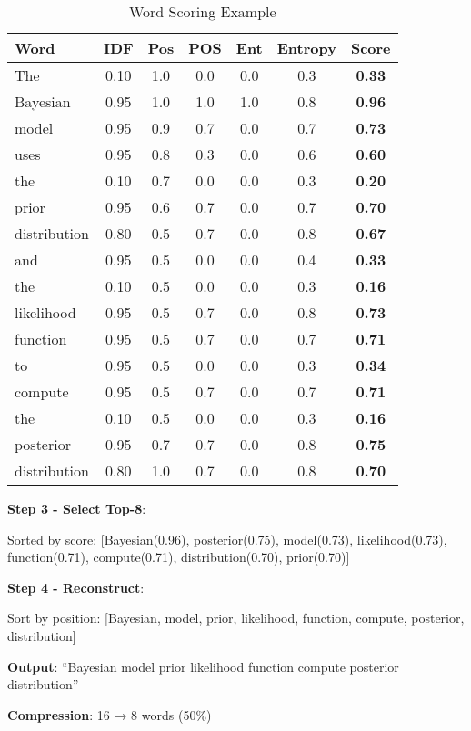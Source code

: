 \begin{table}[h]
\centering
\caption{Word Scoring Example}
\begin{tabular}{lcccccc}
\toprule
Word & IDF & Pos & POS & Ent & Entropy & \textbf{Score} \\
\midrule
The & 0.10 & 1.0 & 0.0 & 0.0 & 0.3 & \textbf{0.33} \\
Bayesian & 0.95 & 1.0 & 1.0 & 1.0 & 0.8 & \textbf{0.96} \\
model & 0.95 & 0.9 & 0.7 & 0.0 & 0.7 & \textbf{0.73} \\
uses & 0.95 & 0.8 & 0.3 & 0.0 & 0.6 & \textbf{0.60} \\
the & 0.10 & 0.7 & 0.0 & 0.0 & 0.3 & \textbf{0.20} \\
prior & 0.95 & 0.6 & 0.7 & 0.0 & 0.7 & \textbf{0.70} \\
distribution & 0.80 & 0.5 & 0.7 & 0.0 & 0.8 & \textbf{0.67} \\
and & 0.95 & 0.5 & 0.0 & 0.0 & 0.4 & \textbf{0.33} \\
the & 0.10 & 0.5 & 0.0 & 0.0 & 0.3 & \textbf{0.16} \\
likelihood & 0.95 & 0.5 & 0.7 & 0.0 & 0.8 & \textbf{0.73} \\
function & 0.95 & 0.5 & 0.7 & 0.0 & 0.7 & \textbf{0.71} \\
to & 0.95 & 0.5 & 0.0 & 0.0 & 0.3 & \textbf{0.34} \\
compute & 0.95 & 0.5 & 0.7 & 0.0 & 0.7 & \textbf{0.71} \\
the & 0.10 & 0.5 & 0.0 & 0.0 & 0.3 & \textbf{0.16} \\
posterior & 0.95 & 0.7 & 0.7 & 0.0 & 0.8 & \textbf{0.75} \\
distribution & 0.80 & 1.0 & 0.7 & 0.0 & 0.8 & \textbf{0.70} \\
\bottomrule
\end{tabular}
\end{table}

\textbf{Step 3 - Select Top-8}:

Sorted by score: [Bayesian(0.96), posterior(0.75), model(0.73), likelihood(0.73), function(0.71), compute(0.71), distribution(0.70), prior(0.70)]

\textbf{Step 4 - Reconstruct}:

Sort by position: [Bayesian, model, prior, likelihood, function, compute, posterior, distribution]

\textbf{Output}: ``Bayesian model prior likelihood function compute posterior distribution''

\textbf{Compression}: 16 → 8 words (50\%)

